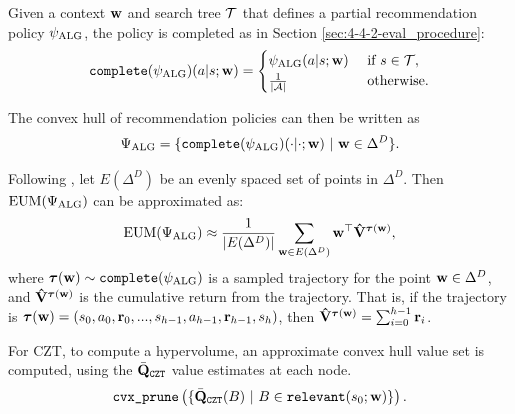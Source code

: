
    Given a context $\mathbf{w}$ and search tree $\mathcal{T}$ that defines a partial recommendation policy $\psi_{{\textnormal{ALG}}}$, the policy is completed as in Section \ref{sec:4-4-2-eval_procedure}:
    \begin{align}
        \texttt{complete}(\psi_{{\textnormal{ALG}}})(a|s;\mathbf{w}) =
        \begin{cases}
            \psi_{{\textnormal{ALG}}}(a|s;\mathbf{w})                       & \text{ if } s\in\mathcal{T}, \\
            \frac{1}{|\mathcal{A}|}      & \text{ otherwise.}
        \end{cases} \label{eq:5:full_Recommend}
    \end{align}

    The convex hull of recommendation policies can then be written as
    \begin{align}
        \Psi_{\alg} = \{\texttt{complete}(\psi_{\alg})(\cdot|\cdot;\bff{w})\ |\ \bff{w}\in\Delta^D \}.
    \end{align}

    Following \citet{well_spaced_points}, let $E(\Delta^D)$ be an evenly spaced set of points in $\Delta^D$. Then ${\textnormal{EUM}}(\Psi_{{\textnormal{ALG}}})$ can be approximated as:
    \begin{align}
        {\textnormal{EUM}}(\Psi_{{\textnormal{ALG}}}) \approx \frac{1}{|E(\Delta^D)|}\sum_{\mathbf{w}\in E(\Delta^D)} \mathbf{w}^\top \mathbf{\hat{V}}^{\boldsymbol{\tau}(\mathbf{w})},
    \end{align}
    where $\boldsymbol{\tau}(\mathbf{w}) \sim \texttt{complete}(\psi_{{\textnormal{ALG}}})$ is a sampled trajectory for the point $\mathbf{w}\in\Delta^D$, and $\mathbf{\hat{V}}^{\boldsymbol{\tau}(\mathbf{w})}$ is the cumulative return from the trajectory. That is, if the trajectory is $\boldsymbol{\tau}(\mathbf{w})=(s_0,a_0,\mathbf{r}_0,...,s_{h-1},a_{h-1},\mathbf{r}_{h-1},s_h)$, then $\mathbf{\hat{V}}^{\boldsymbol{\tau}(\mathbf{w})} = \sum_{i=0}^{h-1} \mathbf{r}_i$.

    For CZT, to compute a hypervolume, an approximate convex hull value set is computed, using the $\bar{\mathbf{Q}}_{\textnormal{\texttt{CZT}}}$ value estimates at each node. 
    \begin{align}
        \cprune \left( \{\Qczt(B)\ |\ 
            B\in\relevant(s_0;\bff{w})\} \right). \label{eq:5:czt_chvs}
    \end{align}

